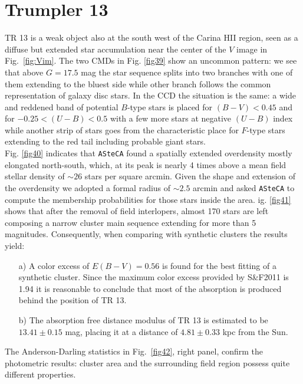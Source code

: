 \documentclass[referee]{aa}
\begin{document}
\section{Trumpler 13}

TR 13 is a weak object also at the south west of the Carina HII
region, seen as a diffuse but extended star accumulation near the center of the
$V$ image in Fig.~\ref{fig:Vim}. The two CMDs in Fig. \ref{fig39} show an
uncommon pattern: we see that above $G=17.5$ mag the star sequence splits
into two branches with one of them extending to the bluest side while other
branch follows the common representation of galaxy disc stars.
In the CCD the situation is the same: a wide and reddened band of potential
$B$-type stars is placed for $(B-V)<0.45$ and for $-0.25<(U-B)<0.5$ with a few
more stars at negative $(U-B)$ index while another strip of stars goes from the
characteristic place for $F$-type stars extending to the red tail including
probable giant stars.\\

Fig. \ref{fig40} indicates that \texttt{ASteCA} found a spatially extended
overdensity mostly elongated north-south, which, at its peak is nearly 4 times
above a mean field stellar density of $\sim26$ stars per square arcmin. Given
the shape and extension of the overdensity we adopted a formal radius of
$\sim2.5$ arcmin and asked \texttt{ASteCA} to compute the membership
probabilities for those stars inside the area. 
ig. \ref{fig41} shows that after the removal of field interlopers, almost 170
stars are left composing a narrow cluster main sequence extending for more than
5 magnitudes. Consequently, when comparing with synthetic clusters the results
yield:

\begin{itemize}
\item [a)] A color excess of $E(B-V)=0.56$ is found for the best fitting
of a synthetic cluster. Since the maximum color excess provided by S\&F2011
is 1.94 it is reasonable to conclude that most of the absorption is produced
behind the position of TR 13.
\item [b)] The absorption free distance modulus of TR 13 is estimated to be
$13.41\pm0.15$ mag, placing it at a distance of $4.81\pm0.33$ kpc from
the Sun.
\end{itemize}

The Anderson-Darling statistics in Fig.~\ref{fig42}, right panel, confirm the
photometric results: cluster area and the surrounding field region
possess quite different properties.\\
\end{document}
